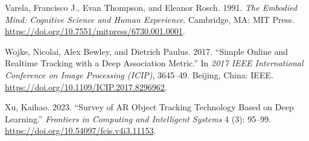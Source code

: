 \begin{CSLReferences}{1}{0}
Varela, Francisco J., Evan Thompson, and Eleanor Rosch. 1991. \emph{The
Embodied Mind: Cognitive Science and Human Experience}. Cambridge, MA:
MIT Press. \url{https://doi.org/10.7551/mitpress/6730.001.0001}.

Wojke, Nicolai, Alex Bewley, and Dietrich Paulus. 2017. {``Simple Online
and Realtime Tracking with a Deep Association Metric.''} In \emph{2017
IEEE International Conference on Image Processing (ICIP)}, 3645--49.
Beijing, China: IEEE. \url{https://doi.org/10.1109/ICIP.2017.8296962}.

Xu, Kaihao. 2023. {``Survey of AR Object Tracking Technology Based on
Deep Learning.''} \emph{Frontiers in Computing and Intelligent Systems}
4 (3): 95--99. \url{https://doi.org/10.54097/fcis.v4i3.11153}.

\end{CSLReferences}
